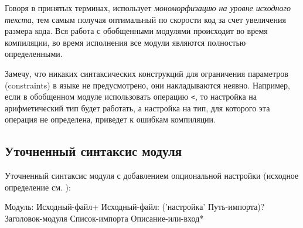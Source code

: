 Говоря в принятых терминах, \thelang{} использует \emph{мономорфизацию на уровне исходного текста}, 
тем самым получая оптимальный по скорости код за счет увеличения размера кода. 
Вся работа с обобщенными модулями происходит во время компиляции, во время исполнения все модули являются полностью определенными.

Замечу, что никаких синтаксических конструкций для ограничения параметров (constraints) в языке не предусмотрено, 
они накладываются неявно.
Например, если в обобщенном модуле использовать операцию \verb+<+, то настройка на арифметический тип будет работать, 
а настройка на тип, для которого эта операция не определена, приведет к ошибкам компиляции.


\hypertarget{refine-module}{%
\subsection{Уточненный синтаксис модуля}\label{generic:refine-module}}

Уточненный синтаксис модуля с добавлением опциональной настройки (исходное определение см. ):
\begin{Grammar}[vspace=2pt]
Модуль: Исходный-файл+
Исходный-файл:
    ('настройка' Путь-импорта)?
    Заголовок-модуля
    Список-импорта
    Описание-или-вход*
\end{Grammar} 
